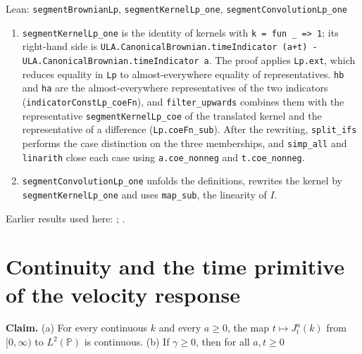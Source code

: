 \documentclass[11pt,a4paper]{article}
\begin{document}
\begin{leanbox}{Lean: \texttt{segmentBrownianLp}, \texttt{segmentKernelLp\_\allowbreak{}one}, \texttt{segmentConvolutionLp\_\allowbreak{}one}}
\begin{enumerate}


\item \texttt{segment\allowbreak{}Kernel\allowbreak{}Lp\_\allowbreak{}one} is the identity of kernels with \texttt{k = fun \_\allowbreak{} => 1}; its right-hand side is \texttt{ULA.\allowbreak{}Canonical\allowbreak{}Brownian.\allowbreak{}time\allowbreak{}Indicator (a+t) -\allowbreak{} ULA.\allowbreak{}Canonical\allowbreak{}Brownian.\allowbreak{}time\allowbreak{}Indicator a}. The proof applies \texttt{Lp.\allowbreak{}ext}, which reduces equality in \texttt{Lp} to almost-everywhere equality of representatives. \texttt{hb} and \texttt{ha} are the almost-everywhere representatives of the two indicators (\texttt{indicator\allowbreak{}Const\allowbreak{}Lp\_\allowbreak{}coe\allowbreak{}Fn}), and \texttt{filter\_\allowbreak{}upwards} combines them with the representative \texttt{segment\allowbreak{}Kernel\allowbreak{}Lp\_\allowbreak{}coe} of the translated kernel and the representative of a difference (\texttt{Lp.\allowbreak{}coe\allowbreak{}Fn\_\allowbreak{}sub}). After the rewriting, \texttt{split\_\allowbreak{}ifs} performs the case distinction on the three memberships, and \texttt{simp\_\allowbreak{}all} and \texttt{linarith} close each case using \texttt{a.\allowbreak{}coe\_\allowbreak{}nonneg} and \texttt{t.\allowbreak{}coe\_\allowbreak{}nonneg}.

\item \texttt{segment\allowbreak{}Convolution\allowbreak{}Lp\_\allowbreak{}one} unfolds the definitions, rewrites the kernel by \texttt{segment\allowbreak{}Kernel\allowbreak{}Lp\_\allowbreak{}one} and uses \texttt{map\_\allowbreak{}sub}, the linearity of \(I\).

\end{enumerate}
\end{leanbox}


Earlier results used here: \cite[Section~3.8.2]{LangevinLean2026ULASC}; \cite[Section~3.8.9]{LangevinLean2026ULASC}.

\section{\texorpdfstring{Continuity and the time primitive of the velocity response}{Continuity and the time primitive of the velocity response}}


\textbf{Claim.} (a) For every continuous \(k\) and every \(a\ge0\), the map \(t\mapsto J^a_t(k)\) from \([0,\infty)\) to \(L^2(\mathbb P)\) is continuous. (b) If \(\gamma\ge0\), then for all \(a,t\ge0\)
\end{document}
